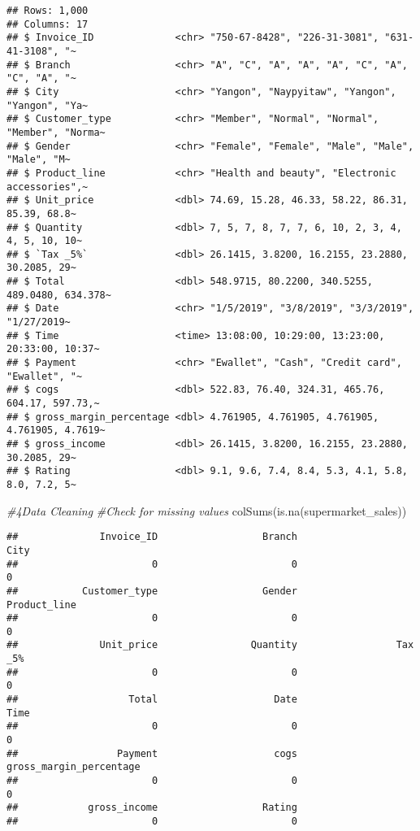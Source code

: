 \documentclass[
]{article}
\newenvironment{Shaded}{\begin{snugshade}}{\end{snugshade}}
\newcommand{\CommentTok}[1]{\textcolor[rgb]{0.56,0.35,0.01}{\textit{#1}}}
\newcommand{\FunctionTok}[1]{\textcolor[rgb]{0.00,0.00,0.00}{#1}}
\newcommand{\NormalTok}[1]{#1}
\begin{document}
\begin{verbatim}
## Rows: 1,000
## Columns: 17
## $ Invoice_ID              <chr> "750-67-8428", "226-31-3081", "631-41-3108", "~
## $ Branch                  <chr> "A", "C", "A", "A", "A", "C", "A", "C", "A", "~
## $ City                    <chr> "Yangon", "Naypyitaw", "Yangon", "Yangon", "Ya~
## $ Customer_type           <chr> "Member", "Normal", "Normal", "Member", "Norma~
## $ Gender                  <chr> "Female", "Female", "Male", "Male", "Male", "M~
## $ Product_line            <chr> "Health and beauty", "Electronic accessories",~
## $ Unit_price              <dbl> 74.69, 15.28, 46.33, 58.22, 86.31, 85.39, 68.8~
## $ Quantity                <dbl> 7, 5, 7, 8, 7, 7, 6, 10, 2, 3, 4, 4, 5, 10, 10~
## $ `Tax _5%`               <dbl> 26.1415, 3.8200, 16.2155, 23.2880, 30.2085, 29~
## $ Total                   <dbl> 548.9715, 80.2200, 340.5255, 489.0480, 634.378~
## $ Date                    <chr> "1/5/2019", "3/8/2019", "3/3/2019", "1/27/2019~
## $ Time                    <time> 13:08:00, 10:29:00, 13:23:00, 20:33:00, 10:37~
## $ Payment                 <chr> "Ewallet", "Cash", "Credit card", "Ewallet", "~
## $ cogs                    <dbl> 522.83, 76.40, 324.31, 465.76, 604.17, 597.73,~
## $ gross_margin_percentage <dbl> 4.761905, 4.761905, 4.761905, 4.761905, 4.7619~
## $ gross_income            <dbl> 26.1415, 3.8200, 16.2155, 23.2880, 30.2085, 29~
## $ Rating                  <dbl> 9.1, 9.6, 7.4, 8.4, 5.3, 4.1, 5.8, 8.0, 7.2, 5~
\end{verbatim}

\begin{Shaded}
\begin{Highlighting}[]
\CommentTok{\#4Data Cleaning}
\CommentTok{\#Check for missing values}
\FunctionTok{colSums}\NormalTok{(}\FunctionTok{is.na}\NormalTok{(supermarket\_sales))}
\end{Highlighting}
\end{Shaded}

\begin{verbatim}
##              Invoice_ID                  Branch                    City 
##                       0                       0                       0 
##           Customer_type                  Gender            Product_line 
##                       0                       0                       0 
##              Unit_price                Quantity                 Tax _5% 
##                       0                       0                       0 
##                   Total                    Date                    Time 
##                       0                       0                       0 
##                 Payment                    cogs gross_margin_percentage 
##                       0                       0                       0 
##            gross_income                  Rating 
##                       0                       0
\end{verbatim}
\end{document}
